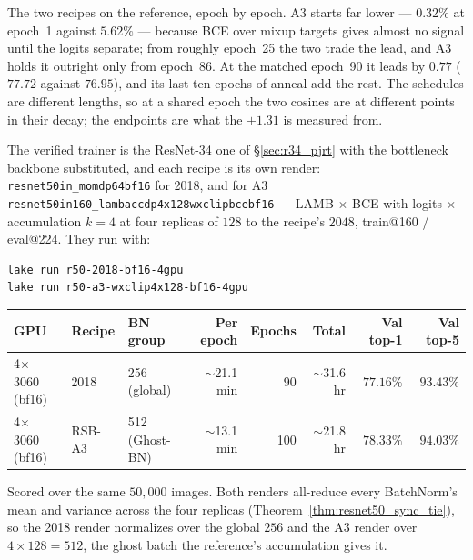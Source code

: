 \noindent The two recipes on the reference, epoch by epoch. A3 starts far
lower --- $0.32\%$ at epoch~1 against $5.62\%$ --- because BCE over mixup
targets gives almost no signal until the logits separate; from roughly
epoch~25 the two trade the lead, and A3 holds it outright only from
epoch~86. At the matched epoch~90 it leads by $0.77$ ($77.72$ against
$76.95$), and its last ten epochs of anneal add the rest. The schedules are
different lengths, so at a shared epoch the two cosines are at different
points in their decay; the endpoints are what the $+1.31$ is measured from.

\label{sec:r50_pjrt}

The verified trainer is the ResNet-34 one of \S\ref{sec:r34_pjrt} with the
bottleneck backbone substituted, and each recipe is its own render:
\texttt{resnet50in\_momdp64bf16} for 2018, and for A3
\texttt{resnet50in160\_lambaccdp4x128wxclipbcebf16} --- LAMB $\times$
BCE-with-logits $\times$ accumulation $k=4$ at four replicas of $128$ to
the recipe's $2048$, train@160 / eval@224. They run with:

\begin{verbatim}
lake run r50-2018-bf16-4gpu
lake run r50-a3-wxclip4x128-bf16-4gpu
\end{verbatim}

\begin{center}
\begin{tabular}{l l l r r r r r}
\hline
GPU & Recipe & BN group & Per epoch & Epochs & Total & Val top-1 & Val top-5 \\
\hline
4$\times$ 3060 (bf16) & 2018   & 256 (global)   & $\sim$21.1 min & 90  & $\sim$31.6 hr & $\mathbf{77.16\%}$ & $\mathbf{93.43\%}$ \\
4$\times$ 3060 (bf16) & RSB-A3 & 512 (Ghost-BN) & $\sim$13.1 min & 100 & $\sim$21.8 hr & $\mathbf{78.33\%}$ & $\mathbf{94.03\%}$ \\
\hline
\end{tabular}
\end{center}

\noindent Scored over the same $50{,}000$ images. Both renders all-reduce
every BatchNorm's mean and variance across the four replicas
(Theorem~\ref{thm:resnet50_sync_tie}), so the 2018 render normalizes over
the global $256$ and the A3 render over $4 \times 128 = 512$, the ghost
batch the reference's accumulation gives it.

